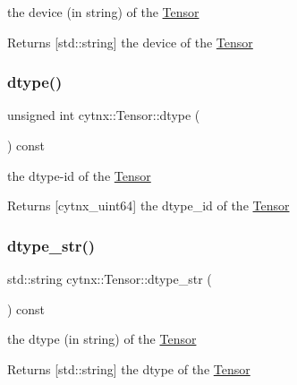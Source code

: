 the device (in string) of the \hyperlink{classcytnx_1_1Tensor}{Tensor} 

\begin{DoxyReturn}{Returns}
\mbox{[}std\+::string\mbox{]} the device of the \hyperlink{classcytnx_1_1Tensor}{Tensor} 
\end{DoxyReturn}
\mbox{\label{classcytnx_1_1Tensor_a4472af6f8e825a13440e832bf82fb627}} 
\subsubsection{\texorpdfstring{dtype()}{dtype()}}
{\footnotesize\ttfamily unsigned int cytnx\+::\+Tensor\+::dtype (\begin{DoxyParamCaption}{ }\end{DoxyParamCaption}) const\hspace{0.3cm}{\ttfamily [inline]}}



the dtype-\/id of the \hyperlink{classcytnx_1_1Tensor}{Tensor} 

\begin{DoxyReturn}{Returns}
\mbox{[}cytnx\+\_\+uint64\mbox{]} the dtype\+\_\+id of the \hyperlink{classcytnx_1_1Tensor}{Tensor} 
\end{DoxyReturn}
\mbox{\label{classcytnx_1_1Tensor_a9e09106c7529e8be90caa52e1541e498}} 
\subsubsection{\texorpdfstring{dtype\+\_\+str()}{dtype\_str()}}
{\footnotesize\ttfamily std\+::string cytnx\+::\+Tensor\+::dtype\+\_\+str (\begin{DoxyParamCaption}{ }\end{DoxyParamCaption}) const\hspace{0.3cm}{\ttfamily [inline]}}



the dtype (in string) of the \hyperlink{classcytnx_1_1Tensor}{Tensor} 

\begin{DoxyReturn}{Returns}
\mbox{[}std\+::string\mbox{]} the dtype of the \hyperlink{classcytnx_1_1Tensor}{Tensor} 
\end{DoxyReturn}
\mbox{\label{classcytnx_1_1Tensor_afdb4470e0dc934964d80aa9c761cca48}} 

